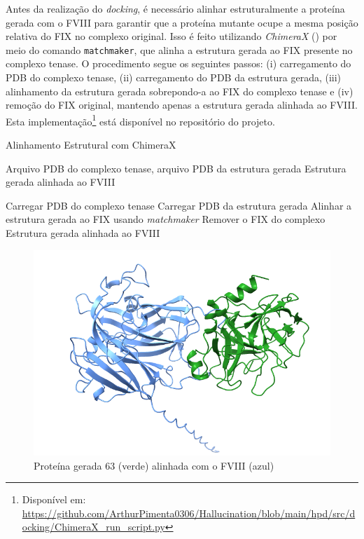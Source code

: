 Antes da realização do \textit{docking}, é necessário alinhar estruturalmente a proteína gerada com o FVIII
para garantir que a proteína mutante ocupe a mesma posição relativa do FIX no complexo original. 
Isso é feito utilizando \textit{ChimeraX} (\cite{ChimeraX}) por meio do comando \texttt{matchmaker}, 
que alinha a estrutura gerada ao FIX presente no complexo tenase. 
O procedimento segue os seguintes passos: (i) carregamento do PDB do complexo tenase, 
(ii) carregamento do PDB da estrutura gerada, (iii) alinhamento da estrutura gerada sobrepondo-a ao FIX do complexo tenase 
e (iv) remoção do FIX original, mantendo apenas a estrutura gerada alinhada ao FVIII.
Esta implementação\footnote{Disponível em: \url{https://github.com/ArthurPimenta0306/Hallucination/blob/main/hpd/src/docking/ChimeraX_run_script.py}} está disponível
no repositório do projeto.

\begin{algorithm}
  \caption{Alinhamento Estrutural com ChimeraX}
  \label{alg:alignment_chimerax}
  \begin{algorithmic}[1]
  \Require Arquivo PDB do complexo tenase, arquivo PDB da estrutura gerada
  \Ensure Estrutura gerada alinhada ao FVIII

  \State Carregar PDB do complexo tenase
  \State Carregar PDB da estrutura gerada
  \State Alinhar a estrutura gerada ao FIX usando \textit{matchmaker}
  \State Remover o FIX do complexo
  \State \Return Estrutura gerada alinhada ao FVIII
  \end{algorithmic}
\end{algorithm}


\begin{figure}[H]
  \centering
  \includegraphics[width=.6\textwidth]{figuras/complexocomid63.png}
  \caption{Proteína gerada 63 (verde) alinhada com o FVIII (azul)}
\end{figure}

